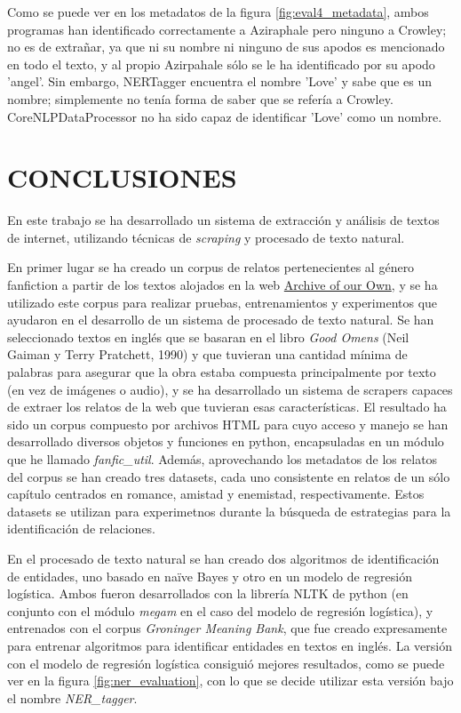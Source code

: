 \documentclass{pre-tfg}
\begin{document}
Como se puede ver en los metadatos de la figura \ref{fig:eval4_metadata}, ambos programas han identificado correctamente a Aziraphale pero ninguno a Crowley; no es de extrañar, ya que ni su nombre ni ninguno de sus apodos es mencionado en todo el texto, y al propio Azirpahale sólo se le ha identificado por su apodo 'angel'. Sin embargo, NERTagger encuentra el nombre 'Love' y sabe que es un nombre; simplemente no tenía forma de saber que se refería a Crowley. CoreNLPDataProcessor no ha sido capaz de identificar 'Love' como un nombre.


\cleardoublepage

\section{CONCLUSIONES}


En este trabajo se ha desarrollado un sistema de extracción y análisis de textos de internet, utilizando técnicas de \textit{scraping} y procesado de texto natural.

En primer lugar se ha creado un corpus de relatos pertenecientes al género fanfiction a partir de los textos alojados en la web \href{https://www.archiveofourown.org/}{Archive of our Own}, y se ha utilizado este corpus para realizar pruebas, entrenamientos y experimentos que ayudaron en el desarrollo de un sistema de procesado de texto natural. Se han seleccionado textos en inglés que se basaran en el libro \textit{Good Omens} (Neil Gaiman y Terry Pratchett, 1990) y que tuvieran una cantidad mínima de palabras para asegurar que la obra estaba compuesta principalmente por texto (en vez de imágenes o audio), y se ha desarrollado un sistema de scrapers capaces de extraer los relatos de la web que tuvieran esas características. El resultado ha sido un corpus compuesto por archivos HTML para cuyo acceso y manejo se han desarrollado diversos objetos y funciones en python, encapsuladas en un módulo que he llamado \textit{fanfic\_util}. Además, aprovechando los metadatos de los relatos del corpus se han creado tres datasets, cada uno consistente en relatos de un sólo capítulo centrados en romance, amistad y enemistad, respectivamente. Estos datasets se utilizan para experimetnos durante la búsqueda de estrategias para la identificación de relaciones.

En el procesado de texto natural se han creado dos algoritmos de identificación de entidades, uno basado en naïve Bayes y otro en un modelo de regresión logística. Ambos fueron desarrollados con la librería NLTK de python (en conjunto con el módulo \textit{megam} en el caso del modelo de regresión logística), y entrenados con el corpus \textit{Groninger Meaning Bank}, que fue creado expresamente para entrenar algoritmos para identificar entidades en textos en inglés. La versión con el modelo de regresión logística consiguió mejores resultados, como se puede ver en la figura \ref{fig:ner_evaluation}, con lo que se decide utilizar esta versión bajo el nombre \textit{NER\_tagger}.
\end{document}
